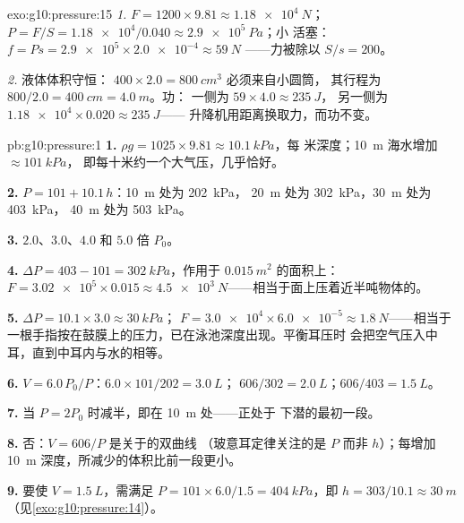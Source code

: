 \begin{solution}{exo:g10:pressure:15}
\emph{1.}  $F = 1200 \times 9.81 \approx \qty{1.18e4}{N}$；
 $P = F/S = \num{1.18e4}/0.040 \approx \qty{2.9e5}{Pa}$；小
活塞：$f = P s = \num{2.9e5} \times \num{2.0e-4} \approx \qty{59}{N}$
——力被除以 $S/s = 200$。

\emph{2.} 液体体积守恒：
$400 \times 2.0 = \qty{800}{cm^3}$ 必须来自小圆筒，
其行程为 $800/2.0 = \qty{400}{cm} = \qty{4.0}{m}$。功：
一侧为 $59 \times 4.0 \approx \qty{235}{J}$，
另一侧为 $\num{1.18e4} \times 0.020 \approx \qty{235}{J}$——
升降机用距离换取力，而功不变。
\end{solution}

\begin{solution}{pb:g10:pressure:1}
\textbf{1.} $\rho g = 1025 \times 9.81 \approx \qty{10.1}{kPa}$，每
米深度；\qty{10}{m} 海水增加 $\approx \qty{101}{kPa}$，
即每十米约一个大气压，几乎恰好。

\textbf{2.} $P = 101 + 10.1\,h$：\qty{10}{m} 处为 \qty{202}{kPa}，
\qty{20}{m} 处为 \qty{302}{kPa}，\qty{30}{m} 处为 \qty{403}{kPa}，
\qty{40}{m} 处为 \qty{503}{kPa}。

\textbf{3.} $2.0$、$3.0$、$4.0$ 和 $5.0$ 倍 $P_0$。

\textbf{4.} $\Delta P = 403 - 101 = \qty{302}{kPa}$，作用于
$\qty{0.015}{m^2}$ 的面积上：$F = \num{3.02e5} \times 0.015 \approx
\qty{4.5e3}{N}$——相当于面上压着近半吨物体的。

\textbf{5.} $\Delta P = 10.1 \times 3.0 \approx \qty{30}{kPa}$；
$F = \num{3.0e4} \times \num{6.0e-5} \approx \qty{1.8}{N}$——相当于
一根手指按在鼓膜上的压力，已在泳池深度出现。平衡耳压时
会把空气压入中耳，直到中耳内与水的相等。

\textbf{6.} $V = 6.0 \, P_0/P$：$6.0 \times 101/202 = \qty{3.0}{L}$；
$606/302 = \qty{2.0}{L}$；$606/403 = \qty{1.5}{L}$。

\textbf{7.} 当 $P = 2P_0$ 时减半，即在 \qty{10}{m} 处——正处于
下潜的最初一段。

\textbf{8.} 否：$V = 606/P$ 是关于的双曲线
（玻意耳定律关注的是 $P$ 而非 $h$）；每增加 \qty{10}{m}
深度，所减少的体积比前一段更小。

\textbf{9.} 要使 $V = \qty{1.5}{L}$，需满足
$P = 101 \times 6.0/1.5 = \qty{404}{kPa}$，即
$h = 303/10.1 \approx \qty{30}{m}$（见\cref{exo:g10:pressure:14}）。


\end{solution}
